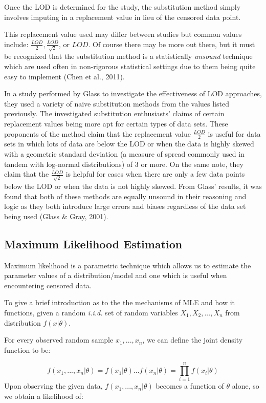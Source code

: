 \documentclass[12pt, twoside]{amherstthesis}
\begin{document}
Once the LOD is determined for the study, the substitution method simply involves imputing in a replacement value in lieu of the censored data point.

This replacement value used may differ between studies but common values include: \(\frac{LOD}{2}, \frac{LOD}{\sqrt2}\), or \(LOD\). Of course there may be more out there, but it must be recognized that the substitution method is a statistically \emph{unsound} technique which are used often in non-rigorous statistical settings due to them being quite easy to implement (Chen et al., 2011).

In a study performed by Glass to investigate the effectiveness of LOD approaches, they used a variety of naive substitution methods from the values listed previously. The investigated substitution enthusiasts' claims of certain replacement values being more apt for certain types of data sets. These proponents of the method claim that the replacement value \(\frac{LOD}{2}\) is useful for data sets in which lots of data are below the LOD or when the data is highly skewed with a geometric standard deviation (a measure of spread commonly used in tandem with log-normal distributions) of 3 or more. On the same note, they claim that the \(\frac{LOD}{\sqrt2}\) is helpful for cases when there are only a few data points below the LOD or when the data is not highly skewed. From Glass' results, it was found that both of these methods are equally unsound in their reasoning and logic as they both introduce large errors and biases regardless of the data set being used (Glass \& Gray, 2001).

\hypertarget{MLE}{%
\subsection{Maximum Likelihood Estimation}\label{MLE}}

Maximum likelihood is a parametric technique which allows us to estimate the parameter values of a distribution/model and one which is useful when encountering censored data.

To give a brief introduction as to the the mechanisms of MLE and how it functions, given a random \emph{i.i.d.} set of random variables \(X_1, X_2,...,X_n\) from distribution \(f(x|\theta)\).

For every observed random sample \(x_1,...,x_n\), we can define the joint density function to be:

\[f(x_1,...,x_n|\theta) = f(x_1|\theta)...f(x_n|\theta) = \prod_{i=1}^{n}f(x_i|\theta)\]
Upon observing the given data, \(f(x_1,...,x_n|\theta)\) becomes a function of \(\theta\) alone, so we obtain a likelihood of:
\end{document}
